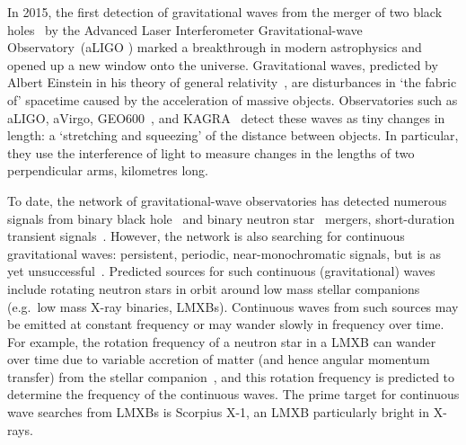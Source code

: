 \documentclass[paper-main.tex]{subfiles}
\begin{document}
In 2015, the first detection of gravitational waves from the merger of two black holes~\cite{GW150914} by the Advanced Laser Interferometer Gravitational-wave Observatory~(aLIGO \citep{AdvancedLIGO:2015}) marked a breakthrough in modern astrophysics and opened up a new window onto the universe. 
Gravitational waves, predicted by Albert Einstein in his theory of general relativity~\cite{Einstein:1916}, are disturbances in `the fabric of' spacetime caused by the acceleration of massive objects.
Observatories such as aLIGO, aVirgo, GEO600~\cite{GEO600:2010}, and KAGRA~\cite{KAGRA:2013} detect these waves as tiny changes in length: a `stretching and squeezing' of the distance between objects.
In particular, they use the interference of light to measure changes in the lengths of two perpendicular arms, kilometres long.


To date, the network of gravitational-wave observatories has detected numerous signals from binary black hole~\cite{GW151226,GW170104,GW170814} and binary neutron star~\cite{GW170817,GW170817multi,GW190425} mergers, short-duration transient signals~\cite{GWTC-1:2018,GWOSC:online}. 
However, the network is also searching for continuous gravitational waves: persistent, periodic, near-monochromatic signals, but is as yet unsuccessful~\cite{ScoX1O2Viterbi:2019,RadiometerO1O2:2019,SearchCrossCorrO1:2017,ScoX1ViterbiO1:2017,SearchRadiometerO1:2017,SearchCrossCorrO1:2017,MiddletonEtAlO2LMXBs:2020,SearchTwoSpecS6:2017}.
Predicted sources for such continuous (gravitational) waves include rotating neutron stars in orbit around low mass stellar companions (e.g.\ low mass X-ray binaries, LMXBs). Continuous waves from such sources may be emitted at constant frequency or may wander slowly in frequency over time. 
For example, the rotation frequency of a neutron star in a LMXB can wander over time due to variable accretion of matter (and hence angular momentum transfer) from the stellar companion~\cite{xraybinaries:1997}, and this rotation frequency is predicted to determine the frequency of the continuous waves.
The prime target for continuous wave searches from LMXBs is Scorpius X-1, an LMXB particularly bright in X-rays.
\end{document}
